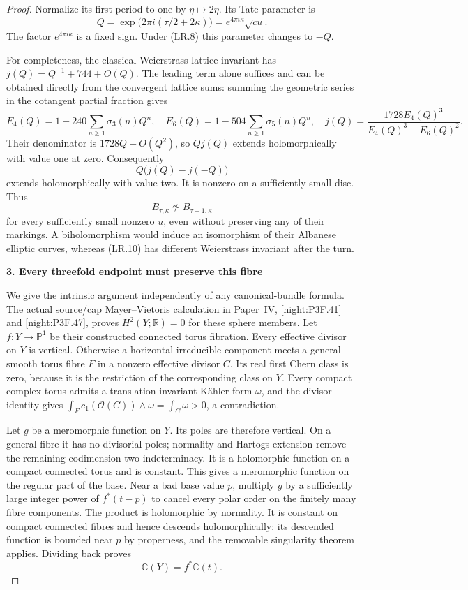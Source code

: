 \begin{proof}
Normalize its first period to one by \(\eta\mapsto2\eta\). Its
Tate parameter is
\[
 Q=\exp\bigl(2\pi i(\tau/2+2\kappa)\bigr)
    =e^{4\pi i\kappa}\sqrt{cu}.                     \tag{LR.10}
\]
The factor \(e^{4\pi i\kappa}\) is a fixed sign. Under (LR.8)
this parameter changes to \(-Q\).

For completeness, the classical Weierstrass lattice invariant has
\(j(Q)=Q^{-1}+744+O(Q)\). The leading term alone suffices and can
be obtained directly from the convergent lattice sums: summing the
geometric series in the cotangent partial fraction gives
\[
 E_4(Q)=1+240\sum_{n\ge1}\sigma_3(n)Q^n,
 \quad E_6(Q)=1-504\sum_{n\ge1}\sigma_5(n)Q^n,
 \quad
 j(Q)=\frac{1728E_4(Q)^3}{E_4(Q)^3-E_6(Q)^2}.
\]
Their denominator is \(1728Q+O(Q^2)\), so \(Qj(Q)\) extends
holomorphically with value one at zero. Consequently
\[
 Q\bigl(j(Q)-j(-Q)\bigr)
\]
extends holomorphically with value two. It is nonzero on a
sufficiently small disc. Thus
\[
            B_{\tau,\kappa}\not\simeq
            B_{\tau+1,\kappa}                       \tag{LR.11}
\]
for every sufficiently small nonzero \(u\), even without preserving
any of their markings. A biholomorphism would induce an isomorphism
of their Albanese elliptic curves, whereas (LR.10) has different
Weierstrass invariant after the turn.

\par

\medskip\noindent\textbf{3. Every threefold endpoint must preserve this fibre}

\par\nobreak

We give the intrinsic argument independently of any canonical-bundle
formula. The actual source/cap Mayer--Vietoris calculation in Paper~IV, \ref{night:P3F.41} and \ref{night:P3F.47},
proves \(H^2(Y;\mathbb R)=0\) for these sphere members. Let
\(f:Y\to\mathbb P^1\) be their constructed connected torus fibration.
Every effective divisor on \(Y\) is vertical. Otherwise a horizontal
irreducible component meets a general smooth torus fibre \(F\) in
a nonzero effective divisor \(C\). Its real first Chern class is
zero, because it is the restriction of the corresponding class on
\(Y\). Every compact complex torus admits a translation-invariant
Kähler form \(\omega\), and the divisor identity gives
\(\int_F c_1(\mathcal O(C))\wedge\omega=\int_C\omega>0\), a
contradiction.

Let \(g\) be a meromorphic function on \(Y\). Its poles are
therefore vertical. On a general fibre it has no divisorial poles;
normality and Hartogs extension remove the remaining codimension-two
indeterminacy. It is a holomorphic function on a compact connected
torus and is constant. This gives a meromorphic function on the
regular part of the base. Near a bad base value \(p\), multiply
\(g\) by a sufficiently large integer power of \(f^*(t-p)\) to
cancel every polar order on the finitely many fibre components.
The product is holomorphic by normality. It is constant on compact
connected fibres and hence descends holomorphically: its descended
function is bounded near \(p\) by properness, and the removable
singularity theorem applies. Dividing back proves
\[
                   \mathbb C(Y)=f^*\mathbb C(t).      \tag{LR.12}
\]


\end{proof}
